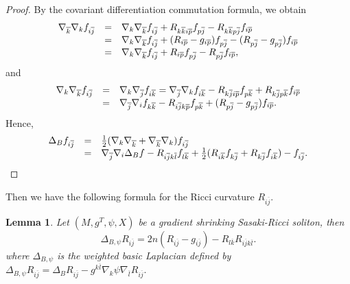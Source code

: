 \documentclass[12pt]{amsart}%
\newtheorem{lemma}{Lemma}
\numberwithin{equation}{section}
\begin{document}
\begin{proof}
By the covariant differentiation commutation formula, we obtain%
\[%
\begin{array}
[c]{lll}%
\nabla_{\overline{k}}\nabla_{k}f_{i\overline{j}} & = & \nabla_{k}%
\nabla_{\overline{k}}f_{i\overline{j}}+R_{k\overline{k}i\overline{p}%
}f_{p\overline{j}}-R_{k\overline{k}p\overline{j}}f_{i\overline{p}}\\
& = & \nabla_{k}\nabla_{\overline{k}}f_{i\overline{j}}+(R_{i\overline{p}%
}-g_{i\overline{p}})f_{p\overline{j}}-(R_{p\overline{j}}-g_{p\overline{j}%
})f_{i\overline{p}}\\
& = & \nabla_{k}\nabla_{\overline{k}}f_{i\overline{j}}+R_{i\overline{p}%
}f_{p\overline{j}}-R_{p\overline{j}}f_{i\overline{p}},
\end{array}
\]
and%
\[%
\begin{array}
[c]{lll}%
\nabla_{k}\nabla_{\overline{k}}f_{i\overline{j}} & = & \nabla_{k}%
\nabla_{\overline{j}}f_{i\overline{k}}=\nabla_{\overline{j}}\nabla
_{k}f_{i\overline{k}}-R_{k\overline{j}i\overline{p}}f_{p\overline{k}%
}+R_{k\overline{j}p\overline{k}}f_{i\overline{p}}\\
& = & \nabla_{\overline{j}}\nabla_{i}f_{k\overline{k}}-R_{i\overline
{j}k\overline{p}}f_{p\overline{k}}+(R_{p\overline{j}}-g_{p\overline{j}%
})f_{i\overline{p}}.
\end{array}
\]
Hence,%
\[%
\begin{array}
[c]{lll}%
\Delta_{B}f_{i\overline{j}} & = & \frac{1}{2}(\nabla_{k}\nabla_{\overline{k}%
}+\nabla_{\overline{k}}\nabla_{k})f_{i\overline{j}}\\
& = & \nabla_{\overline{j}}\nabla_{i}\Delta_{B}f-R_{i\overline{j}k\overline
{l}}f_{l\overline{k}}+\frac{1}{2}(R_{i\overline{k}}f_{k\overline{j}%
}+R_{k\overline{j}}f_{i\overline{k}})-f_{i\overline{j}}.
\end{array}
\]

\end{proof}

Then we have the following formula for the Ricci curvature $R_{i\overline{j}}$.

\begin{lemma}
\label{lemma}Let $(M,g^{T},\psi,X)$ be a gradient shrinking Sasaki-Ricci
soliton, then%
\[
\Delta_{B,\psi}R_{i\overline{j}}=2n(R_{i\overline{j}}-g_{i\overline{j}%
})-R_{l\overline{k}}R_{i\overline{j}k\overline{l}}.
\]
where $\Delta_{B,\psi}$ is the weighted basic Laplacian defined by
$\Delta_{B,\psi}R_{i\overline{j}}=\Delta_{B}R_{i\overline{j}}-g^{k\overline
{l}}\nabla_{k}\psi\nabla_{\overline{l}}R_{i\overline{j}}.$
\end{lemma}
\end{document}
